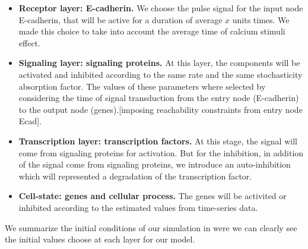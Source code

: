 \begin{itemize}
 \item \textbf{Receptor layer: E-cadherin.} We choose the  pulse signal for the input node E-cadherin, that will be active for a duration of average $x$ units times. We made this 
 choice to take into account the average time of calcium stimuli effect.
 \item \textbf{Signaling layer: signaling proteins.} At this layer, the components will be activated and inhibited according to the same rate and the same stochasticity absorption factor.
 The values of these parameters where selected by considering the time of signal transduction from the entry node (E-cadherin) to the output node (genes).[imposing reachability
 constraints from entry node Ecad].
 \item \textbf{Transcription layer: transcription factors.} At this stage, the signal will come from signaling proteins for activation. But for the inhibition, in addition 
 of the signal come from signaling proteins, we introduce an auto-inhibition which will represented a degradation of the transcription factor.
 \item \textbf{Cell-state: genes and cellular  process.} The genes will be activited or inhibited according to the estimated values from time-series data.
\end{itemize}

We summarize the initial conditions of our simulation in  were we can clearly see the initial values choose at each layer for our model.

